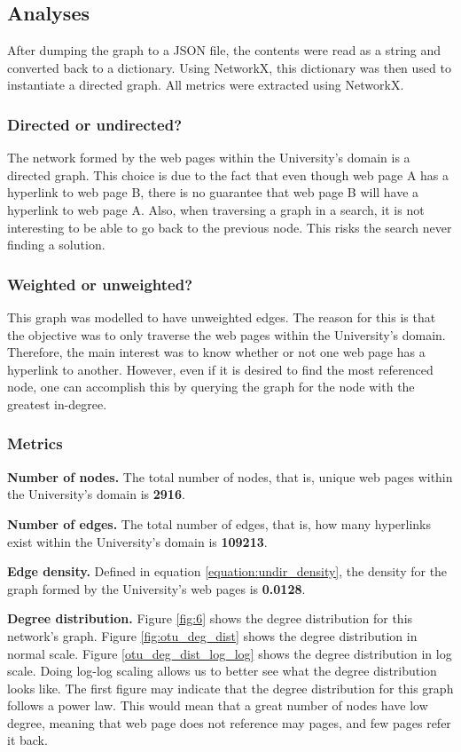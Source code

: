 \subsection{Analyses}
After dumping the graph to a JSON file, the contents were read as a string and converted back to a dictionary. Using NetworkX, this dictionary was then used to instantiate a directed graph. All metrics were extracted using NetworkX.

\subsubsection{Directed or undirected?} The network formed by the web pages within the University's domain is a directed graph. This choice is due to the fact that even though web page A has a hyperlink to web page B, there is no guarantee that web page B will have a hyperlink to web page A. Also, when traversing a graph in a search, it is not interesting to be able to go back to the previous node. This risks the search never finding a solution.

\subsubsection{Weighted or unweighted?} This graph was modelled to have unweighted edges. The reason for this is that the objective was to only traverse the web pages within the University's domain. Therefore, the main interest was to know whether or not one web page has a hyperlink to another. However, even if it is desired to find the most referenced node, one can accomplish this by querying the graph for the node with the greatest in-degree.

\subsubsection{Metrics}
\textbf{Number of nodes.} The total number of nodes, that is, unique web pages within the University's domain is \textbf{2916}.

\textbf{Number of edges.} The total number of edges, that is, how many hyperlinks exist within the University's domain is \textbf{109213}.

\textbf{Edge density.} Defined in equation \ref{equation:undir_density}, the density for the graph formed by the University's web pages is \textbf{0.0128}.

\textbf{Degree distribution.} Figure \ref{fig:6} shows the degree distribution for this network's graph. Figure \ref{fig:otu_deg_dist} shows the degree distribution in normal scale. Figure \ref{otu_deg_dist_log_log} shows the degree distribution in log scale. Doing log-log scaling allows us to better see what the degree distribution looks like. The first figure may indicate that the degree distribution for this graph follows a power law. This would mean that a great number of nodes have low degree, meaning that web page does not reference may pages, and few pages refer it back.

